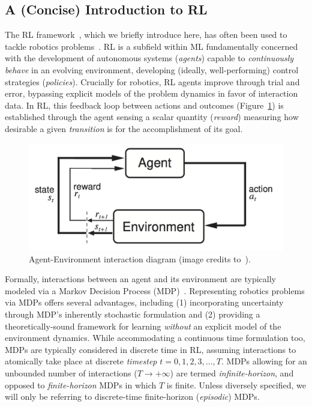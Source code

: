 \subsection{A (Concise) Introduction to RL}
The RL framework~\citep{suttonReinforcementLearningIntroduction2018}, which we briefly introduce here, has often been used to tackle robotics problems~\citep{koberReinforcementLearningRobotics}.
RL is a subfield within ML fundamentally concerned with the development of autonomous systems (\emph{agents}) capable to \emph{continuously behave} in an evolving environment, developing (ideally, well-performing) control strategies (\emph{policies}).
Crucially for robotics, RL agents improve through trial and error, bypassing explicit models of the problem dynamics in favor of interaction data.
In RL, this feedback loop between actions and outcomes (Figure~\ref{fig:rl-most-famous-pic}) is established through the agent sensing a scalar quantity (\emph{reward}) measuring how desirable a given \emph{transition} is for the accomplishment of its goal.

\begin{figure}
    \centering
    \includegraphics[width=0.5\linewidth]{figures/ch3/ch3-agent-env.pdf}
    \caption{Agent-Environment interaction diagram (image credits to~\citet{suttonReinforcementLearningIntroduction2018}).}
    \label{fig:rl-most-famous-pic}
\end{figure}

Formally, interactions between an agent and its environment are typically modeled via a Markov Decision Process (MDP)~\citep{bellmanMarkovianDecisionProcess1957}.
Representing robotics problems via MDPs offers several advantages, including (1) incorporating uncertainty through MDP's inherently stochastic formulation and (2) providing a theoretically-sound framework for learning \emph{without} an explicit model of the environment dynamics.
While accommodating a continuous time formulation too, MDPs are typically considered in discrete time in RL, assuming interactions to atomically take place at discrete \emph{timestep} \( t=0,1,2,3, \dots, T \).
MDPs allowing for an unbounded number of interactions (\( T \to + \infty \)) are termed \emph{infinite-horizon}, and opposed to \emph{finite-horizon} MDPs in which \( T \) is finite.
Unless diversely specified, we will only be referring to discrete-time finite-horizon (\emph{episodic}) MDPs.

